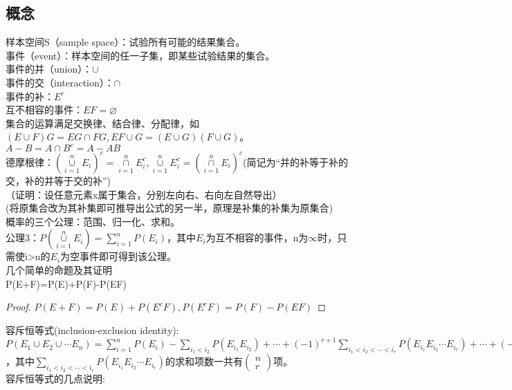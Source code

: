 \documentclass{book}%
\begin{document}
	\subsection{概念}
	样本空间S（sample space）：试验所有可能的结果集合。\\
	事件（event）：样本空间的任一子集，即某些试验结果的集合。\\
	事件的并（union）：$\cup$\\
	事件的交（interaction）：$\cap$\\
	事件的补：$E^{c}$\\
	互不相容的事件：$EF=\varnothing$\\
	集合的运算满足交换律、结合律、分配律，如$(E\cup F)G=EG\cap FG,EF\cup G=(E\cup G)(F\cup G)$。\\
	$A-B=A\cap B^{c}=A-AB$\\
	德摩根律：$\displaystyle ({\mathop{\cup}\limits_{i=1}^{n}}E_{i})^c=\mathop{\cap}\limits_{i=1}^{n}E^{c}_{i},\mathop{\cup}\limits_{i=1}^{n}E^{c}_{i}=(\mathop{\cap}\limits_{i=1}^{n}E_{i})^{c}$(简记为“并的补等于补的交，补的并等于交的补”)\\
	（证明：设任意元素x属于集合，分别左向右、右向左自然导出）\\
	(将原集合改为其补集即可推导出公式的另一半，原理是补集的补集为原集合)\\
	概率的三个公理：范围、归一化、求和。\\
	公理3：$P(\mathop{\cup}\limits_{i=1}^{n}E_{i})=\sum\limits_{i=1}^{n}P(E_{i})$，其中$E_{i}$为互不相容的事件，n为$\infty$时，只需使i>n的$E_{i}$为空事件即可得到该公理。\\
	几个简单的命题及其证明\\
	P(E+F)=P(E)+P(F)-P(EF)\\
	\begin{proof}
		$P(E+F)=P(E)+P(E^{c}F),P(E^{c}F)=P(F)-P(EF)$
	\end{proof}
	容斥恒等式(inclusion-exclusion identity):\\
	$P(E_{1}\cup E_{2}\cup \cdots E_{n})=\sum\limits_{i=1}^{n}P(E_{i})-\sum\limits_{i_{1}<i_{2}}P(E_{i_{1}}E_{i_{2}})+\cdots +(-1)^{r+1}\sum\limits_{i_{1}<i_{2}<\cdots <i_{r}}P(E_{i_{1}}E_{i_{2}}\cdots E_{i_{r}})+\cdots +(-1)^{n+1}P(E_{1}E_{2}\cdots E_{n})$，其中$\sum\limits_{i_{1}<i_{2}<\cdots <i_{r}}P(E_{i_{1}}E_{i_{2}}\cdots E_{i_{r}})$的求和项数一共有$\begin{pmatrix}n\\r\end{pmatrix}$项。\\
	容斥恒等式的几点说明:\\
\end{document}
